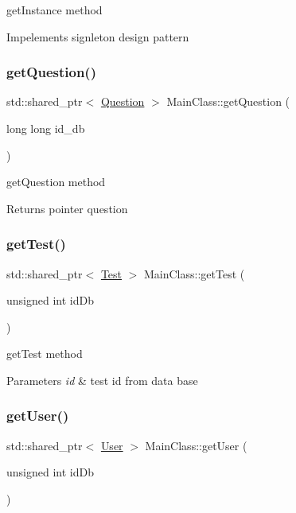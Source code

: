 get\+Instance method 

Impelements signleton design pattern \mbox{\label{class_main_class_a6bdb47e00ec290b6c451483e07f63d80}} 
\subsubsection{\texorpdfstring{get\+Question()}{getQuestion()}}
{\footnotesize\ttfamily std\+::shared\+\_\+ptr$<$ \hyperlink{class_question}{Question} $>$ Main\+Class\+::get\+Question (\begin{DoxyParamCaption}\item[{long long}]{id\+\_\+db }\end{DoxyParamCaption})}



get\+Question method 

\begin{DoxyReturn}{Returns}
pointer question 
\end{DoxyReturn}
\mbox{\label{class_main_class_a0ef6e83729dc97a723a07efd99a2d1b3}} 
\subsubsection{\texorpdfstring{get\+Test()}{getTest()}}
{\footnotesize\ttfamily std\+::shared\+\_\+ptr$<$ \hyperlink{class_test}{Test} $>$ Main\+Class\+::get\+Test (\begin{DoxyParamCaption}\item[{unsigned int}]{id\+Db }\end{DoxyParamCaption})}



get\+Test method 


\begin{DoxyParams}{Parameters}
{\em id} & test id from data base \\
\hline
\end{DoxyParams}
\mbox{\label{class_main_class_ae144428058aa2a87061044ee2515d3cb}} 
\subsubsection{\texorpdfstring{get\+User()}{getUser()}\hspace{0.1cm}{\footnotesize\ttfamily [1/2]}}
{\footnotesize\ttfamily std\+::shared\+\_\+ptr$<$ \hyperlink{class_user}{User} $>$ Main\+Class\+::get\+User (\begin{DoxyParamCaption}\item[{unsigned int}]{id\+Db }\end{DoxyParamCaption})}



